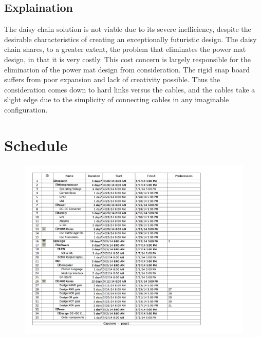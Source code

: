 \documentclass[12pt]{report}
\begin{document}

\subsection*{Explaination}

The daisy chain solution is not viable due to its severe inefficiency, despite the desirable characteristics of creating an exceptionally futuristic design.  The daisy chain shares, to a greater extent, the problem that eliminates the power mat design, in that it is very costly.  This cost concern is largely responsible for the elimination of the power mat design from consideration.  The rigid snap board suffers from poor expansion and lack of creativity possible.  Thus the consideration comes down to hard links versus the cables, and the cables take a slight edge due to the simplicity of connecting cables in any imaginable configuration.  
\newpage
\section*{Schedule}

\begin{figure}[h!]
\begin{center}
	\includegraphics[width=\textwidth]{Schedule}
\label{default}
\end{center}
\end{figure}
\end{document}
